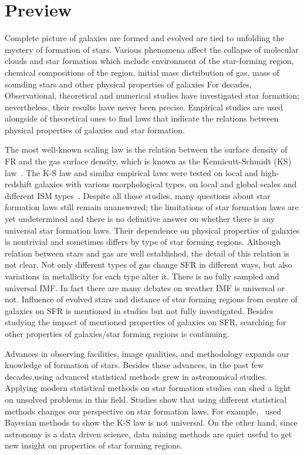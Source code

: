 \section{Preview}
\label{sec: pre_intro}

Complete picture of galaxies are formed and evolved are tied to unfolding the mystery of formation of stars.
 Various phenomena affect the collapse of molecular clouds and star formation which include environment of the star-forming region, chemical compositions of the region, initial mass distribution of gas, mass of sounding stars and other physical properties of galaxies
 For decades, Observational, theoretical and numerical studies have investigated star formation; nevertheless, their results have never been precise. 
 Empirical studies are used alongside of theoretical ones to find laws that indicate the relations between physical properties of galaxies and star formation.

The most well-known scaling law is the relation between the surface density of FR and the gas surface density, which is known as the Kennicutt-Schmidt (KS) law~\citep{Schmidt59, Kennicutt98a}. 
The K-S law and similar empirical laws were tested on local and high-redshift galaxies with various morphological types, on local and global scales and different ISM types~\citep[e.g][]{Kennicutt08,Bigiel08,Genzel10,Gnedin10,Shi11}.
Despite all these studies, many questions about star formation laws still remain unanswered; the limitations of star formation laws are yet undetermined and there is no definitive answer on whether there is any universal star formation laws.
Their dependence on physical properties of galaxies is nontrivial and sometimes differs by type of star forming regions.
Although relation between stars and gas are well established, the detail of this relation is not clear.
Not only different types of gas change SFR in different ways, but also variations in metallicity for each type alter it.
There is no fully sampled and universal IMF.
In fact there are many debates on weather IMF is universal or not.
Influence of evolved stars and distance of star forming regions from centre of galaxies on SFR is mentioned in studies but not fully investigated.
Besides studying the impact of mentioned properties of galaxies on SFR, searching for other properties of galaxies/star forming regions is continuing.

Advances in observing facilities, image qualities, and methodology expands our knowledge of formation of stars.
Besides these advances, in the past few decades,using advanced statistical methods grew in astronomical studies.
Applying modern statistical methods on star formation studies can shed a light on unsolved problems in this field. 
Studies show that using different statistical methods changes our perspective on star formation laws. 
For example,~\cite{Shetty13} used Bayesian methods to show the K-S law is not universal. 
On the other hand, since astronomy is a data driven science, data mining methods are quiet useful to get new insight on properties of star forming regions.


